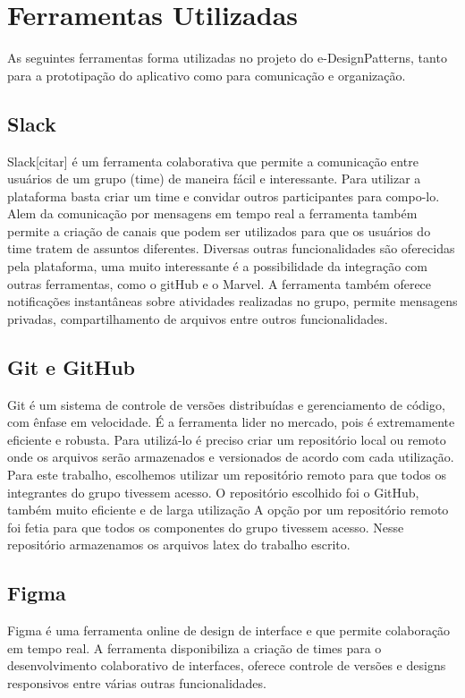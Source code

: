 \section{Ferramentas Utilizadas}

As seguintes ferramentas forma utilizadas no projeto do e-DesignPatterns, tanto para a prototipação do aplicativo como para comunicação e organização.

\subsection{Slack}
Slack[citar] é um ferramenta colaborativa que permite a comunicação entre usuários de um grupo (time) de maneira fácil e interessante. Para utilizar a plataforma basta criar um time e convidar outros participantes para compo-lo. Alem da comunicação por mensagens em tempo real a ferramenta também permite a criação de canais que podem ser utilizados para que os usuários do time tratem de assuntos diferentes. Diversas outras funcionalidades são oferecidas pela plataforma, uma muito interessante é a possibilidade da integração com outras ferramentas, como o gitHub e o Marvel.  A ferramenta também oferece notificações instantâneas sobre atividades realizadas no grupo, permite mensagens privadas, compartilhamento de arquivos entre outros funcionalidades.

\subsection{Git e GitHub}

Git é um sistema de controle de versões distribuídas e gerenciamento de código, com ênfase em velocidade. É a ferramenta lider no mercado, pois é extremamente eficiente e robusta. Para utilizá-lo é preciso criar um repositório local ou remoto onde os arquivos serão armazenados e versionados de acordo com cada utilização. Para este trabalho, escolhemos utilizar um repositório remoto para que todos os integrantes do grupo tivessem acesso. O repositório escolhido foi o GitHub, também muito eficiente e de larga utilização A opção por um repositório remoto foi fetia para que todos os componentes do grupo tivessem acesso. Nesse repositório armazenamos os arquivos latex do trabalho escrito.

\subsection{Figma}

Figma é uma ferramenta online de design de interface e que permite colaboração em tempo real. A ferramenta disponibiliza a criação de times para o desenvolvimento colaborativo de interfaces, oferece controle de versões e designs responsivos entre várias outras funcionalidades.


